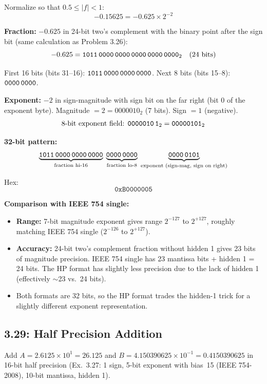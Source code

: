 Normalize so that $0.5 \le |f| < 1$:
\[
  -0.15625 = -0.625 \times 2^{-2}
\]

\noindent\textbf{Fraction:} $-0.625$ in 24-bit two's complement with the binary point
after the sign bit (same calculation as Problem 3.26):
\[
  -0.625 = \texttt{1011\,0000\,0000\,0000\,0000\,0000}_2 \quad\text{(24 bits)}
\]

First 16 bits (bits 31--16): $\texttt{1011\,0000\,0000\,0000}$.
Next 8 bits (bits 15--8): $\texttt{0000\,0000}$.

\noindent\textbf{Exponent:} $-2$ in sign-magnitude with sign bit on the far
right (bit 0 of the exponent byte).
Magnitude $= 2 = 0000010_2$ (7 bits). Sign $= 1$ (negative).
\[
  \text{8-bit exponent field: } \texttt{0000010\,1}_2 = \texttt{00000101}_2
\]

\noindent\textbf{32-bit pattern:}
\[
  \underbrace{\texttt{1011\,0000\,0000\,0000}}_{\text{fraction hi-16}}\;
  \underbrace{\texttt{0000\,0000}}_{\text{fraction lo-8}}\;
  \underbrace{\texttt{0000\,0101}}_{\text{exponent (sign-mag, sign on right)}}
\]

Hex:
\[
  \boxed{\texttt{0xB0000005}}
\]

\medskip\noindent\textbf{Comparison with IEEE 754 single:}
\begin{itemize}
  \item \textbf{Range:} 7-bit magnitude exponent gives range $2^{-127}$ to
        $2^{+127}$, roughly matching IEEE 754 single ($2^{-126}$ to $2^{+127}$).
  \item \textbf{Accuracy:} 24-bit two's complement fraction without hidden 1
        gives 23 bits of magnitude precision. IEEE 754 single has 23 mantissa
        bits + hidden 1 = 24 bits. The HP format has slightly less precision
        due to the lack of hidden 1 (effectively $\sim$23 vs.\ 24 bits).
  \item Both formats are 32 bits, so the HP format trades the hidden-1 trick
        for a slightly different exponent representation.
\end{itemize}
\subsection*{3.29: Half Precision Addition}
\hypertarget{sol-3.29}{}

Add $A = 2.6125 \times 10^{1} = 26.125$ and $B = 4.150390625 \times 10^{-1}
= 0.4150390625$ in 16-bit half precision (Ex.\ 3.27: 1 sign, 5-bit exponent
with bias~15 (IEEE 754-2008), 10-bit mantissa, hidden 1).

